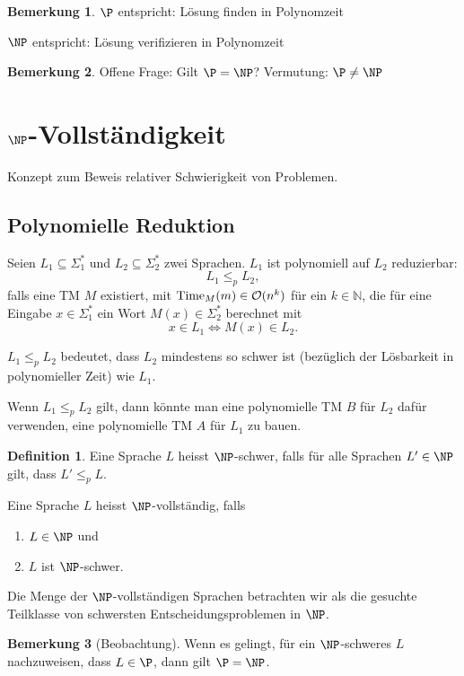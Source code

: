 \documentclass[11pt]{article} %
\theoremstyle{definition}
\newtheorem{definition}{Definition}
\newtheorem*{bemerkung}{Bemerkung}
\begin{document}
\begin{bemerkung}
$\P$ entspricht: Lösung finden in Polynomzeit

$\NP$ entspricht: Lösung verifizieren in Polynomzeit
\end{bemerkung}

\begin{bemerkung}
Offene Frage: Gilt $\P = \NP$? Vermutung: $\P \ne \NP$
\end{bemerkung}

\section{$\NP$-Vollständigkeit}

Konzept zum Beweis relativer Schwierigkeit von Problemen.

\subsection{Polynomielle Reduktion}

Seien $L_1 \subseteq \Sigma_1^*$ und $L_2 \subseteq \Sigma_2^*$ zwei Sprachen. $L_1$ ist polynomiell auf $L_2$ reduzierbar:
\[
L_1 \le_p L_2,
\]
falls eine TM $M$ existiert, mit $\operatorname{Time}_M(m) \in \mathcal{O}(n^k)$ für ein $k \in \mathbb{N}$, die für eine Eingabe $x \in \Sigma_1^*$ ein Wort $M(x) \in \Sigma_2^*$ berechnet mit
\[
x \in L_1 \Leftrightarrow M(x) \in L_2.
\]

$L_1 \le_p L_2$ bedeutet, dass $L_2$ mindestens so schwer ist (bezüglich der Lösbarkeit in polynomieller Zeit) wie $L_1$.

Wenn $L_1 \le_p L_2$ gilt, dann könnte man eine polynomielle TM $B$ für $L_2$ dafür verwenden, eine polynomielle TM $A$ für $L_1$ zu bauen.

\begin{definition}
Eine Sprache $L$ heisst $\NP$-schwer, falls für alle Sprachen $L' \in \NP$ gilt, dass $L' \le_p L$.

Eine Sprache $L$ heisst $\NP$-vollständig, falls
\begin{enumerate}
\item $L \in \NP$ und
\item $L$ ist $\NP$-schwer.
\end{enumerate}
\end{definition}

Die Menge der $\NP$-vollständigen Sprachen betrachten wir als die gesuchte Teilklasse von schwersten Entscheidungsproblemen in $\NP$.

\begin{bemerkung}[Beobachtung]
Wenn es gelingt, für ein $\NP$-schweres $L$ nachzuweisen, dass $L \in \P$, dann gilt $\P = \NP$.
\end{bemerkung}
\end{document}
